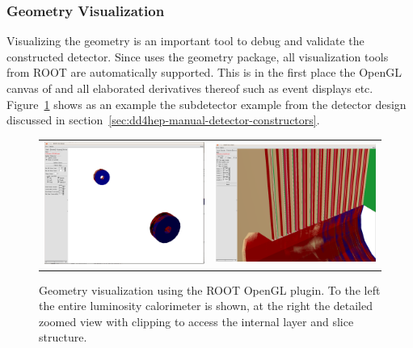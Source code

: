 \documentclass[10pt,a4paper]{article}
\begin{document}
\subsubsection{Geometry Visualization}
\label{sec:dd4hep-manual-geometry-visualization}
\noindent
Visualizing the geometry is an important tool to debug and validate
the constructed detector.
Since \DDhep uses the  geometry package, all visualization tools
from ROOT are automatically supported. This is in the first place the 
OpenGL canvas of  and all elaborated derivatives thereof such as 
event displays etc. Figure~\ref{fig:dd4hep-user-manual-visualization-subdetector}
shows as an example the subdetector example from the  detector design
discussed in section~\ref{sec:dd4hep-manual-detector-constructors}.
\begin{figure}[h]
  \begin{center}
    \begin{tabular}{l r}
      \includegraphics[width=80mm] {DD4hep-Lumical.png} &
      \includegraphics[width=80mm] {DD4hep-Lumical-detailed.png} \\
    \end{tabular}
    \caption{Geometry visualization using the ROOT OpenGL plugin.
        To the left the entire luminosity calorimeter is shown,
        at the right the detailed zoomed view with clipping to 
        access the internal layer and slice structure.}
    \label{fig:dd4hep-user-manual-visualization-subdetector}
  \end{center}
\end{figure}
\end{document}
